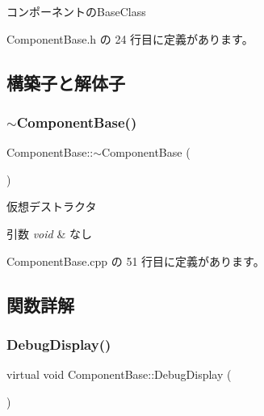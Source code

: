 コンポーネントの\+Base\+Class 

 Component\+Base.\+h の 24 行目に定義があります。



\subsection{構築子と解体子}
\mbox{\label{class_component_base_a80a37e33ecca2471b2186fba1aaf2cdd}} 
\subsubsection{\texorpdfstring{$\sim$\+Component\+Base()}{~ComponentBase()}}
{\footnotesize\ttfamily Component\+Base\+::$\sim$\+Component\+Base (\begin{DoxyParamCaption}{ }\end{DoxyParamCaption})\hspace{0.3cm}{\ttfamily [pure virtual]}}



仮想デストラクタ 


\begin{DoxyParams}{引数}
{\em void} & なし \\
\hline
\end{DoxyParams}


 Component\+Base.\+cpp の 51 行目に定義があります。



\subsection{関数詳解}
\mbox{\label{class_component_base_a36ae7d27ad9d756fa245bad443020407}} 
\subsubsection{\texorpdfstring{Debug\+Display()}{DebugDisplay()}}
{\footnotesize\ttfamily virtual void Component\+Base\+::\+Debug\+Display (\begin{DoxyParamCaption}{ }\end{DoxyParamCaption})\hspace{0.3cm}{\ttfamily [pure virtual]}}



